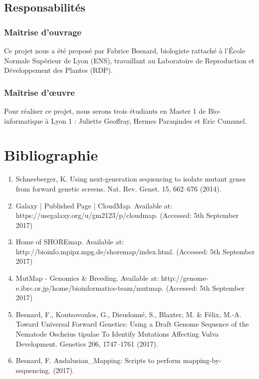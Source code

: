 \documentclass[12pt]{article}
\begin{document}
\subsection{Responsabilités}
\subsubsection{Maîtrise d'ouvrage}

Ce projet nous a été proposé par Fabrice Besnard, biologiste rattaché à l’École Normale Supérieur de Lyon (ENS), travaillant au Laboratoire de Reproduction et Développement des Plantes (RDP).

\subsubsection{Maîtrise d’œuvre}

Pour réaliser ce projet, nous serons trois étudiants en Master 1 de Bio-informatique à Lyon 1 : Juliette Geoffray, Hermes Paraqindes et Eric Cumunel.

\section{Bibliographie}
\begin{enumerate}
\item Schneeberger, K. Using next-generation sequencing to isolate mutant genes from forward genetic screens. Nat. Rev.
Genet. 15, 662–676 (2014).
\item Galaxy | Published Page | CloudMap. Available at: https://usegalaxy.org/u/gm2123/p/cloudmap. (Accessed: 5th
September 2017)
\item Home of SHOREmap. Available at: http://bioinfo.mpipz.mpg.de/shoremap/index.html. (Accessed: 5th September
2017)
\item MutMap - Genomics \& Breeding. Available at: http://genome-e.ibrc.or.jp/home/bioinformatics-team/mutmap.
(Accessed: 5th September 2017)
\item Besnard, F., Koutsovoulos, G., Dieudonné, S., Blaxter, M. \& Félix, M.-A. Toward Universal Forward Genetics:
Using a Draft Genome Sequence of the Nematode Oscheius tipulae To Identify Mutations Affecting Vulva
Development. Genetics 206, 1747–1761 (2017).
\item Besnard, F. Andalusian\_Mapping: Scripts to perform mapping-by-sequencing. (2017).
\end{enumerate}
\end{document}
